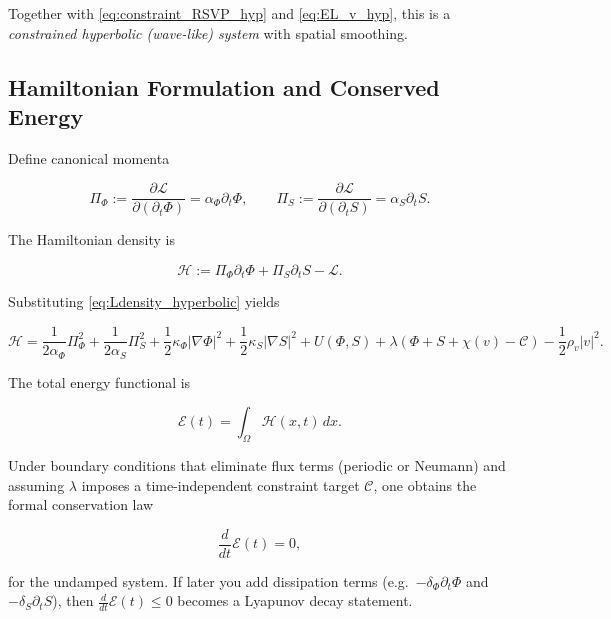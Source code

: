 \documentclass[12pt,a4paper]{article}
\theoremstyle{definition}
\begin{document}
Together with \eqref{eq:constraint_RSVP_hyp} and \eqref{eq:EL_v_hyp}, this is a
\emph{constrained hyperbolic (wave-like) system} with spatial smoothing.

\subsection{Hamiltonian Formulation and Conserved Energy}
\label{subsec:rsvp_hamiltonian}

Define canonical momenta

\begin{equation}
  \Pi_\Phi := \frac{\partial \mathcal{L}}{\partial(\partial_t\Phi)}
  = \alpha_\Phi \partial_t\Phi,
  \qquad
  \Pi_S := \frac{\partial \mathcal{L}}{\partial(\partial_t S)}
  = \alpha_S \partial_t S.
\end{equation}

The Hamiltonian density is

\begin{equation}
  \mathcal{H}
  :=
  \Pi_\Phi \partial_t\Phi + \Pi_S \partial_t S - \mathcal{L}.
\end{equation}

Substituting \eqref{eq:Ldensity_hyperbolic} yields

\begin{equation}
  \mathcal{H}
  =
  \frac{1}{2\alpha_\Phi}\Pi_\Phi^2
  + \frac{1}{2\alpha_S}\Pi_S^2
  + \frac{1}{2}\kappa_\Phi |\nabla \Phi|^2
  + \frac{1}{2}\kappa_S |\nabla S|^2
  + U(\Phi,S)
  + \lambda(\Phi+S+\chi(v)-\mathcal{C})
  - \frac{1}{2}\rho_v |v|^2.
  \label{eq:Hdensity}
\end{equation}

The total energy functional is

\begin{equation}
  \mathcal{E}(t) = \int_\Omega \mathcal{H}(x,t)\,dx.
  \label{eq:Energy_functional}
\end{equation}

Under boundary conditions that eliminate flux terms (periodic or Neumann) and
assuming $\lambda$ imposes a time-independent constraint target $\mathcal{C}$,
one obtains the formal conservation law

\begin{equation}
  \frac{d}{dt}\mathcal{E}(t)=0,
  \label{eq:Energy_conservation}
\end{equation}

for the undamped system.  If later you add dissipation terms
(e.g.\ $-\delta_\Phi \partial_t\Phi$ and $-\delta_S \partial_t S$),
then $\frac{d}{dt}\mathcal{E}(t)\le 0$ becomes a Lyapunov decay statement.
\end{document}
